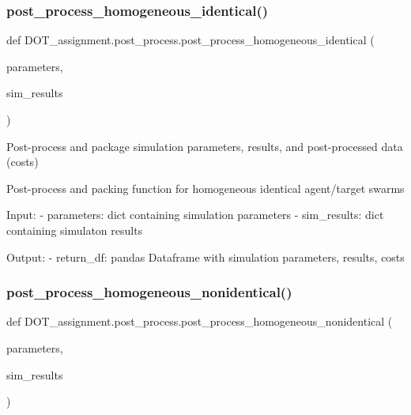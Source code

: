 \subsubsection{\texorpdfstring{post\_process\_homogeneous\_identical()}{post\_process\_homogeneous\_identical()}}
{\footnotesize\ttfamily def D\+O\+T\+\_\+assignment.\+post\+\_\+process.\+post\+\_\+process\+\_\+homogeneous\+\_\+identical (\begin{DoxyParamCaption}\item[{}]{parameters,  }\item[{}]{sim\+\_\+results }\end{DoxyParamCaption})}

\begin{DoxyVerb}Post-process and package simulation parameters, results, and post-processed data (costs)

Post-process and packing function for homogeneous identical agent/target swarms

Input:
- parameters:           dict containing simulation parameters
- sim_results:          dict containing simulaton results

Output:
- return_df:            pandas Dataframe with simulation parameters, results, costs\end{DoxyVerb}
 \mbox{\label{namespace_d_o_t__assignment_1_1post__process_abf2ab504edf8d52d5efb83521560a3ce}} 
\subsubsection{\texorpdfstring{post\_process\_homogeneous\_nonidentical()}{post\_process\_homogeneous\_nonidentical()}}
{\footnotesize\ttfamily def D\+O\+T\+\_\+assignment.\+post\+\_\+process.\+post\+\_\+process\+\_\+homogeneous\+\_\+nonidentical (\begin{DoxyParamCaption}\item[{}]{parameters,  }\item[{}]{sim\+\_\+results }\end{DoxyParamCaption})}

